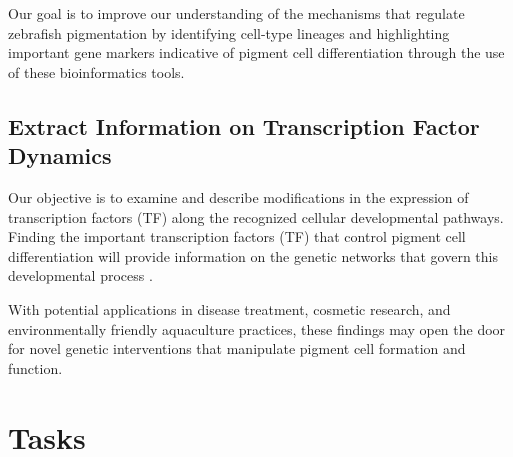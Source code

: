 \documentclass[runningheads]{llncs}
\begin{document}
Our goal is to improve our understanding of the mechanisms that regulate zebrafish pigmentation by identifying cell-type lineages and highlighting important gene markers indicative of pigment cell differentiation through the use of these bioinformatics tools.

\subsection{Extract Information on Transcription Factor Dynamics}
Our objective is to examine and describe modifications in the expression of transcription factors (TF) along the recognized cellular developmental pathways. Finding the important transcription factors (TF) that control pigment cell differentiation will provide information on the genetic networks that govern this developmental process \cite{subkhankulova2023zebrafish,saunders2019thyroid,fabian2022lifelong}. 

With potential applications in disease treatment, cosmetic research, and environmentally friendly aquaculture practices, these findings may open the door for novel genetic interventions that manipulate pigment cell formation and function.

\section{Tasks}
\end{document}
